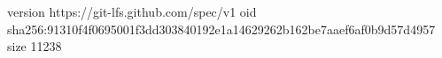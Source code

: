version https://git-lfs.github.com/spec/v1
oid sha256:91310f4f0695001f3dd303840192e1a14629262b162be7aaef6af0b9d57d4957
size 11238
